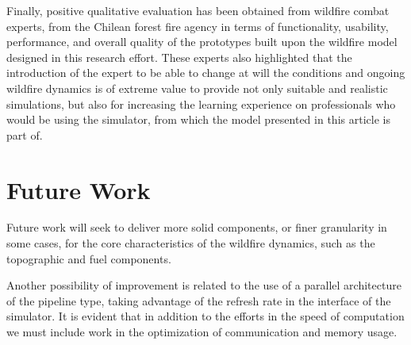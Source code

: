 \documentclass[conference]{IEEEtran}
\begin{document}
    Finally, positive qualitative evaluation has been obtained from wildfire combat experts, from the Chilean forest 
    fire agency in terms of functionality, usability, performance, and overall quality of the prototypes built upon the 
    wildfire model designed in this research effort. These experts also highlighted that the introduction of the 
    expert to be able to change at will the conditions and ongoing wildfire dynamics is of extreme value to provide 
    not only suitable and realistic simulations, but also for increasing the learning experience on professionals who
    would be using the simulator, from which the model presented in this article is part of.
    
    
\section{Future Work}
    
    Future work will seek to deliver more solid components, or finer granularity in some cases, for the core 
    characteristics of the wildfire dynamics, such as the topographic and fuel components. \medskip
    
    Another possibility of improvement is related to the use of a parallel architecture of the pipeline type, 
    taking advantage of the refresh rate in the interface of the simulator. It is evident that in addition to 
    the efforts in the speed of computation we must include work in the optimization of communication and memory usage.


%
\end{document}
